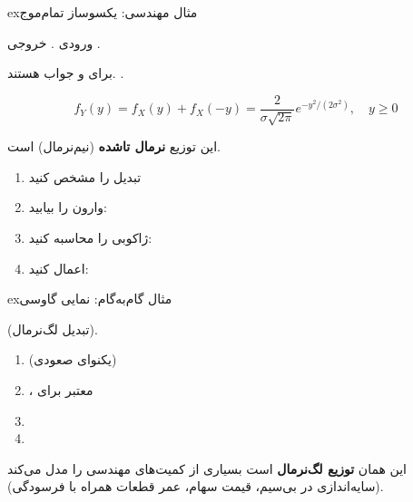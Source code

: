\begin{PSbox}[unbreakable]{ex}{مثال مهندسی: یکسوساز تمام‌موج }

ورودی . خروجی .

برای  و  جواب هستند. .

\[f_Y(y) = f_X(y) + f_X(-y) = \frac{2}{\sigma\sqrt{2\pi}} e^{-y^2/(2\sigma^2)}, \quad y \geq 0\]

این توزیع \textbf{نرمال تاشده} (نیم‌نرمال) است.

\end{PSbox}



\begin{enumerate}
\def\labelenumi{\arabic{enumi}.}
\tightlist
\item
  تبدیل  را مشخص کنید
\item
  وارون را بیابید: 
\item
  ژاکوبی را محاسبه کنید: 
\item
  اعمال کنید: 
\end{enumerate}

\begin{PSbox}[unbreakable]{ex}{مثال گام‌به‌گام: نمایی گاوسی}

 (تبدیل لگ‌نرمال).

\begin{enumerate}
\def\labelenumi{\arabic{enumi}.}
\tightlist
\item
   (یکنوای صعودی)
\item
  ، معتبر برای 
\item
\item
\end{enumerate}

این همان \textbf{توزیع لگ‌نرمال} است  بسیاری از کمیت‌های مهندسی را مدل می‌کند (سایه‌اندازی در بی‌سیم، قیمت سهام، عمر قطعات همراه با فرسودگی).

\end{PSbox}

